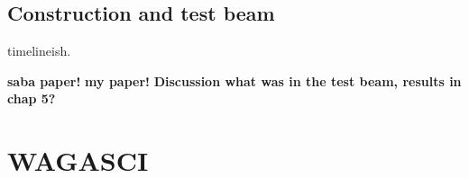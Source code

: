 

\subsection{Construction and test beam}
timelineish.

\textbf{saba paper!}
\textbf{my paper!}
\textbf{Discussion what was in the test beam, results in chap 5?}
\section{WAGASCI}\label{sec:WAGASCI}

